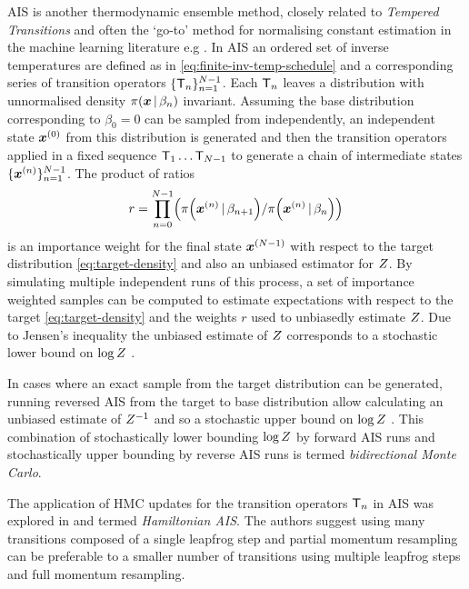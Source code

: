 \ac{AIS} \citep{neal2001annealed} is another thermodynamic ensemble method, closely related to \emph{Tempered Transitions} \citep{neal1996sampling} and often the `go-to' method for normalising constant estimation in the machine learning literature e.g \citep{salakhutdinov2008quantitative,wu2016quantitative}. In \ac{AIS} an ordered set of inverse temperatures are defined as in \eqref{eq:finite-inv-temp-schedule} and a corresponding series of transition operators $\lbrace \mathsf{T}_n \rbrace_{n=1}^{N-1}$. Each $\mathsf{T}_n$ leaves a distribution with unnormalised density $\pi(\boldsymbol{x}\operatorname{|}\beta_n)$ invariant. Assuming the base distribution corresponding to $\beta_0 = 0$ can be sampled from independently, an independent state $\boldsymbol{x}^{(0)}$ from this distribution is generated and then the transition operators applied in a fixed sequence $\mathsf{T}_{1} \dots \mathsf{T}_{N-1}$ to generate a chain of intermediate states $\lbrace \boldsymbol{x}^{(n)} \rbrace_{n=1}^{N-1}$. The product of ratios
\begin{equation}\label{eq:ais-weights}
  r = \prod_{n=0}^{N-1} \lpa \pi\lpa\vct{x}^{(n)}\gvn\beta_{n+1}\rpa / \pi\lpa\vct{x}^{(n)}\gvn\beta_n\rpa \rpa
\end{equation}
is an importance weight for the final state $\boldsymbol{x}^{(N-1)}$ with respect to the target distribution \eqref{eq:target-density} and also an unbiased estimator for $Z$. By simulating multiple independent runs of this process, a set of importance weighted samples can be computed to estimate expectations with respect to the target \eqref{eq:target-density} and the weights $r$ used to unbiasedly estimate $Z$. Due to Jensen's inequality the unbiased estimate of $Z$ corresponds to a stochastic lower bound on $\log Z$ \citep{grosse2015sandwiching}.

In cases where an exact sample from the target distribution can be generated, running reversed \ac{AIS} from the target to base distribution allow calculating an unbiased estimate of $Z^{-1}$ and so a stochastic upper bound on $\log Z$ \citep{grosse2015sandwiching}. This combination of stochastically lower bounding $\log Z$ by forward \ac{AIS} runs and stochastically upper bounding by reverse \ac{AIS} runs is termed \emph{bidirectional Monte Carlo}.

The application of \ac{HMC} updates for the transition operators $\mathsf{T}_n$ in \ac{AIS} was explored in \citep{sohl2012hamiltonian} and termed \emph{Hamiltonian \ac{AIS}}. The authors suggest using many transitions composed of a single leapfrog step and partial momentum resampling can be preferable to a smaller number of transitions using multiple leapfrog steps and full momentum resampling. 

